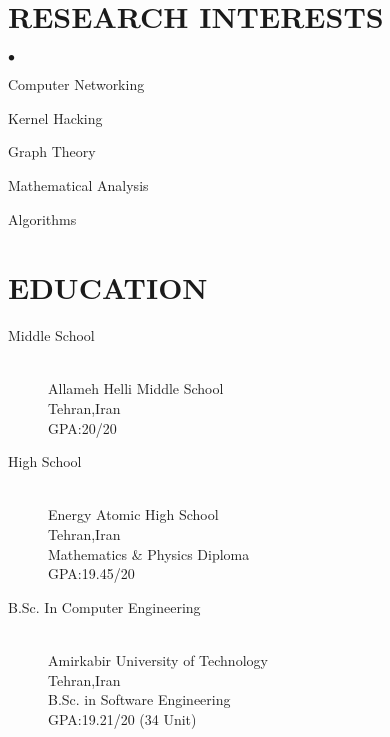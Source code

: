 \documentclass{res}
\begin{document}
\address{\bf  PRESENT ADDRESS\\31 27th Avenue\\16th St.\\Amirabad St.\\Tehran, Iran}
\address{
	\bf CONTACT INFORMATION \\
	Email:\href{mailto:parham.alvani@gmail.com}{parham.alvani@gmail.com} \\
	Phone:		+98-912-449-3153  \\
	Homepage:\href{http://1995parham.github.io}{1995parham.github.io}
}

\begin{resume}
	\section{RESEARCH INTERESTS}
	
	\begin{list}{$\bullet$}{}
	\item{Computer Networking}
	\item{Kernel Hacking}
	\item{Graph Theory}
	\item{Mathematical Analysis}
	\item{Algorithms}
	\end{list}
	
	\section{EDUCATION}
	
	\begin{description}
		\item[Middle School] \hfill \\
			Allameh Helli Middle School \hfill \\
			Tehran,Iran \hfill \\
			GPA:20/20				
		\item[High School] \hfill \\
			Energy Atomic High School \hfill \\
			Tehran,Iran \hfill \\
			Mathematics \& Physics Diploma \hfill \\
			GPA:19.45/20	
		\item[B.Sc. In Computer Engineering] \hfill \\
			Amirkabir University of Technology \hfill \\
			Tehran,Iran \hfill \\
			B.Sc. in Software Engineering \hfill \\
			GPA:19.21/20 (34 Unit)
	\end{description}
	

\end{resume}
\end{document}
